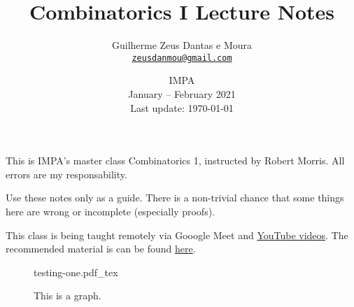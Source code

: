 \documentclass[a4paper, 10pt]{article}
\title{\sffamily \bfseries Combinatorics I Lecture Notes}
\author{\sc Guilherme Zeus Dantas e Moura\\\href{mailto:zeusdanmou@gmail.com}{\texttt{zeusdanmou@gmail.com}}}
\date{IMPA\\[3pt] January -- February 2021\\[3pt] Last update: \today}
\newcommand{\incfig}[2][1]{%
    \def\svgwidth{#1\columnwidth}
    {#2.pdf_tex}
}
\begin{document}
    \maketitle
	\sloppy
	
		This is IMPA's master class Combinatorics 1, instructed by Robert Morris.
		All errors are my responsability.

		Use these notes only as a guide. There is a non-trivial chance that some things here are wrong or incomplete (especially proofs).

		This class is being taught remotely via Gooogle Meet and \href{https://www.youtube.com/playlist?list=PLo4jXE-LdDTSkmHd3xNGhcObfWXvpwmCL}{YouTube videos}. The recommended material is can be found \href{http://w3.impa.br/~rob/Extremal_and_probabilistic_combinatorics.pdf}{here}.

		\begin{figure}[ht]
			\centering
			\incfig[.8]{testing-one}
			\caption{This is a graph.}
			\label{fig:testing-one}
		\end{figure}
		
	\tableofcontents

	\newpage
    
    
\end{document}
